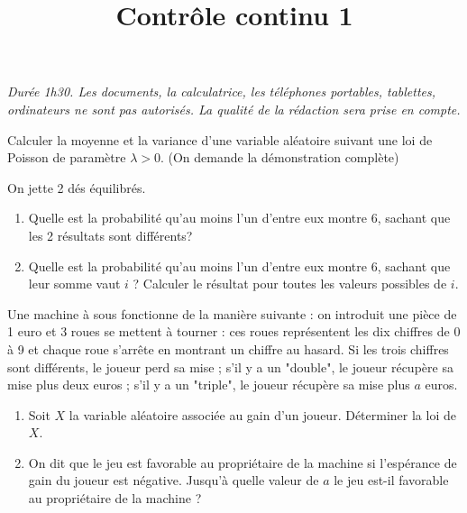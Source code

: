 \documentclass[a4paper]{tp_um}
\title{\large \sffamily\bfseries Contrôle continu 1}
\begin{document}
\maketitle
\textit{Durée 1h30. Les documents, la calculatrice, les téléphones portables, tablettes, ordinateurs ne sont pas autorisés. La qualité de la rédaction sera prise en compte.} 

\bigskip
\bigskip

Calculer la moyenne et la variance d'une variable aléatoire suivant une loi de Poisson de paramètre $\lambda>0$. (On demande la démonstration complète)
		\vspace*{8cm}

\exo{} On jette 2 dés équilibrés.
\begin{enumerate}
\item Quelle est la probabilité qu'au moins l'un d'entre eux montre 6, sachant que les 2 résultats sont différents?
	\vspace*{4cm}
\item Quelle est la probabilité qu'au moins l'un d'entre eux montre 6, sachant
que leur somme vaut $i$ ? Calculer le résultat pour toutes les valeurs possibles de $i$.
	\vspace*{4cm}
\newpage
	\vspace*{4cm}
\end{enumerate}

\exo{} Une machine à sous fonctionne de la manière suivante : on introduit une pièce de 1 euro et 3 roues se mettent à tourner : ces roues représentent les dix chiffres de 0 à 9 et chaque roue s'arrête en montrant un chiffre au hasard. Si les trois chiffres sont différents, le joueur perd sa mise ; s'il y a un "double", le joueur récupère sa mise plus deux euros ; s'il y a un "triple", le joueur récupère sa mise plus $a$ euros.
\begin{enumerate}
\item Soit $X$ la variable aléatoire associée au gain d'un joueur. Déterminer la loi de $X$.	
\vspace*{8cm}

\item On dit que le jeu est favorable au propriétaire de la machine si l'espérance de gain du joueur est négative. Jusqu'à quelle valeur de $a$ le jeu est-il favorable au propriétaire de la machine ?	
\vfill{}\newpage
\end{enumerate}

\end{document}
